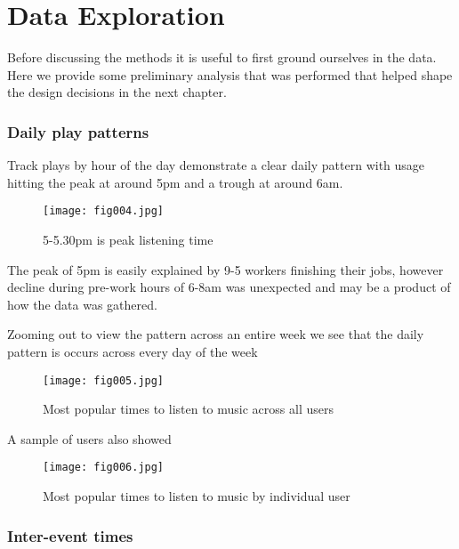 
\chapter{Data Exploration} %

Before discussing the methods it is useful to first ground ourselves in the data. Here we provide some preliminary analysis that was performed that helped shape the design decisions in the next chapter.

\label{Chapter3}

\subsection{Daily play patterns}

Track plays by hour of the day demonstrate a clear daily pattern with usage hitting the peak at around 5pm and a trough at around 6am. 

\begin{figure}[h!]
	\centering
	\texttt{[image: fig004.jpg]}
	\caption{5-5.30pm is peak listening time}
	\label{fig:fig4}
\end{figure} 

The peak of 5pm is easily explained by 9-5 workers finishing their jobs, however decline during pre-work hours of 6-8am was unexpected and may be a product of how the data was gathered.

Zooming out to view the pattern across an entire week we see that the daily pattern is occurs across every day of the week

\begin{figure}[h!]
	\centering
	\texttt{[image: fig005.jpg]}
	\caption{Most popular times to listen to music across all users}
	\label{fig:fig5}
\end{figure} 


A sample of users also showed 

\begin{figure}[h!]
	\centering
	\texttt{[image: fig006.jpg]}
	\caption{Most popular times to listen to music by individual user}
	\label{fig:fig6}
\end{figure} 

\subsection{Inter-event times}

